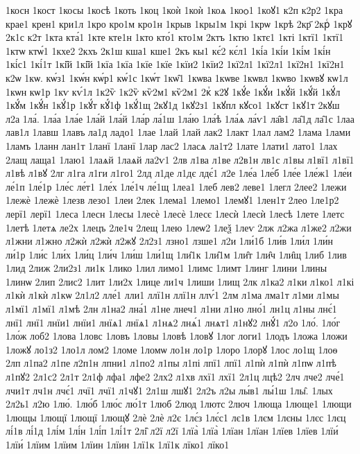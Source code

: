 {1косн
1кост
1косы
1косѣ
1коть
1коц
1коѝ
1коѝ
1коѧ
1коѻ1
1коꙋ1
к2п
к2р2
1кра
крае1
крен1
кри1л
1кро
кро1м
кро1н
1крыв
1кры1м
1крі
1крѡ
1крѣ
2кр҃
2крⷭ
1крꙋ
2к1с
к2т
1кта
кта́1
1кте
кте1н
1кто
кто́1
кто1м
2ктъ
1ктю
1ктє1
1кті
1ктї1
1ктї1
1ктѡ
ктѡ́1
1кхе2
2кхъ
2к1ш
кша1
кше1
2къ
кы1
кє́2
кє́л1
1кі́а
1кі́и
1кі́м
1кі́н
1кі́с1
1кі́1т
1кі̑й
1кі̑й
1кїа
1кїа
1кїе
1кїе
1кїи2
1кїи2
1кї2л1
1кї2л1
1кї2н1
1кї2н1
к2ѡ
1кѡ.
кѡ́з1
1кѡ́н
кѡ́р1
кѡ́1с
1кѡ́т
1кѡ̑1
1кѡва
1кѡве
1кѡвл
1кѡво
1кѡвꙋ
кѡ1л
1кѡн
кѡ1р
1кѵ
кѵ́1л
1к2ѷ
1к2ѷ
кѷ2м1
кѷ2м1
2кⷮ
к2ꙋ
1кꙋ́е
1кꙋ́и
1кꙋ́й
1кꙋ́й
1кꙋ́л
1кꙋ́м
1кꙋ́н
1кꙋ́1р
1кꙋ́т
кꙋ́1ф
1кꙋ́1щ
2кꙋ1д
1кꙋ2з1
1кꙋпл
кꙋсо1
1кꙋст
1кꙋ1т
2кꙋш
л2а
1ла́.
1ла́а
1ла́е
1ла́й
1ла́й
1ла́р
ла́1ш
1ла́ю
1ла́ѣ
1ла́ѧ
ла́ѵ1
ла̑в1
ла̑1д
ла̑1с
1лаа
лав1л
1лавш
1лавъ
ла1д
ладо1
1лае
1лай
1лай
лак2
1лакт
1лал
лам2
1лама
1лами
1ламъ
1ланн
лан1т
1ланї
1ланї
1лар
лас2
1ласѧ
ла1т2
1лате
1лати1
лато1
1лах
2лащ
лаща1
1лаю1
1лаѧй
1лаѧй
ла2ѵ1
2лв
л1ва
л1ве
л2в1н
лв1с
л1вы
л1вї1
л1вї1
л1вѣ
л1вꙋ
2лг
л1га
л1ги
л1го1
2лд
л1де
л1дє
лдє́1
л2е
1ле́а
1ле́б
1ле́е
1ле́ж1
1ле́и
ле́1п
1ле́1р
1ле́с
ле́т1
1ле́х
1ле́1ч
ле́1щ
1леа1
1леб
лев2
леве1
1легл
2лее2
1лежи
1лежѐ
1лежѐ
1лезв
лезо1
1леи
2лек
1лема1
1лемо1
1лемꙋ1
1лен1т
2лео
1ле1р2
лерї1
лерї1
1леса
1лесн
1лесы
1лесѐ
1лесѐ
1лесє
1лесѝ
1лесѝ
1лесѣ
1лете
1летс
1летѣ
1летѧ
ле2х
1лецъ
2ле1ч
2лещ
1лею
1леѡ2
1леѯ
1леѵ
2лж
л2жа
л1же2
л2жи
л1жни
л1жно
л2жѝ
л2жѝ
л2жꙋ
2л2з1
лзно1
лзше1
л2и
1ли́1б
1ли́в
1ли́л
1ли́н
ли́1р
1ли́с
1ли́х
1ли́ц
1ли́ч
1ли́ш
1ли́1щ
1ли̑1к
1ли̑1м
1ли̑т
1ли̑ч
1ли̑щ
1либ
1лив
1лид
2лиж
2ли2з1
ли1к
1лико
1лил
лимо1
1лимс
1лимт
1линг
1лини
1лины
1линѡ
2лип
2лис2
1лит
1ли2х
1лице
ли1ч
1лиши
1лищ
2лк
л1ка2
л1ки
л1ко1
л1кі
л1кѝ
л1кѝ
л1кѡ
2л1л2
лле́1
лли1
ллї1н
ллї1н
ллѵ́1
2лм
л1ма
лма1т
л1ми
л1мы
л1мї1
л1мї1
л1мѣ
2лн
л1на2
лна́1
л1не
лнеч1
л1ни
л1но
лно́1
лн1ц
л1ны
лнє́1
лнї1
лнї1
лнїи1
лнїи1
лнїѧ1
лнїѧ1
л1нѧ2
лнѧ́1
лнѧт1
л1нꙋ2
лнꙋ́1
л2о
1ло́.
1ло́г
1ло́ж
лоб2
1лова
1ловс
1ловъ
1ловы
1ловѣ
1ловꙋ
1лог
логи1
1лодъ
1ложа
1ложи
1ложꙋ
ло1з2
1ло1л
лом2
1ломе
1ломѡ
ло1н
ло1р
1лоро
1лорꙋ
1лос
ло1щ
1лоѳ
2лп
л1па2
л1пе
л2п1н
лпни1
л1по2
л1пы
л1пі
лпї1
лпї1
л1пѝ
л1пѝ
л1пѡ
л1пѣ
л1пꙋ2
2л1с2
2л1т
2л1ф
лфа1
лфе2
2лх2
л1хв
лхї1
лхї1
2л1ц
лцѣ2
2лч
лче2
лче́1
лчи1т
лч1н
лчє́1
лчї1
лчї1
л1чꙋ1
2л1ш
лшꙋ1
2л2ъ
л2ы
лы́в1
лы́1ш
1лы̑.
1лых
2л2ь1
л2ю
1лю́.
1лю́б
1лю́с
лю́1т
1люб
2люд
1лютс
2люч
1люща
1люще1
1лющи
1лющы
1лющї
1лющї
1лющꙋ
2лѐ
2лѐ
л2є
1лє́з
1лє́с1
лє1в
1лєм
1лєны
1лєс
1лєц
лі́1в
лі́1д
1лі́м
1лі́н
1лі́п
1лі́1т
2лі̑
л2ї
л2ї
1лїа̀
1лїа̀
1лїан
1лїан
1лїев
1лїев
1лїи́
1лїи́
1лїим
1лїим
1лїин
1лїин
1лї1к
1лї1к
лїко1
лїко1
}
